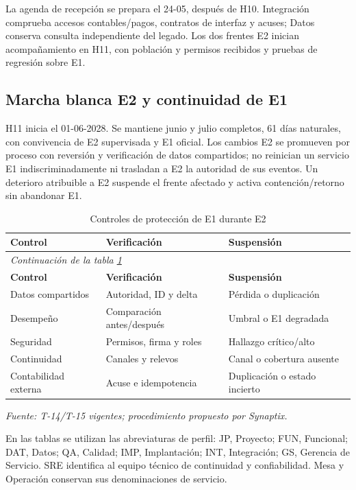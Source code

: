 La agenda de recepción se prepara el 24-05, después de H10. Integración comprueba accesos contables/pagos, contratos de interfaz y acuses; Datos conserva consulta independiente del legado. Los dos frentes E2 inician acompañamiento en H11, con población y permisos recibidos y pruebas de regresión sobre E1.

\subsection{Marcha blanca E2 y continuidad de E1}
H11 inicia el 01-06-2028. Se mantiene junio y julio completos, 61 días naturales, con convivencia de E2 supervisada y E1 oficial. Los cambios E2 se promueven por proceso con reversión y verificación de datos compartidos; no reinician un servicio E1 indiscriminadamente ni trasladan a E2 la autoridad de sus eventos. Un deterioro atribuible a E2 suspende el frente afectado y activa contención/retorno sin abandonar E1.

\begingroup\small\setlength{\tabcolsep}{3pt}
\begin{longtable}{p{}p{}p{}}
\caption{Controles de protección de E1 durante E2}\label{tab:t18-proteccion-e1}\\\hline
\textbf{Control} & \textbf{Verificación} & \textbf{Suspensión}\\\hline\endfirsthead
\multicolumn{3}{l}{\textit{Continuación de la tabla \ref{tab:t18-proteccion-e1}}}\\\hline
\textbf{Control} & \textbf{Verificación} & \textbf{Suspensión}\\\hline\endhead
\hline\endfoot\hline\endlastfoot
Datos compartidos & Autoridad, ID y delta & Pérdida o duplicación\\\hline
Desempeño & Comparación antes/después & Umbral o E1 degradada\\\hline
Seguridad & Permisos, firma y roles & Hallazgo crítico/alto\\\hline
Continuidad & Canales y relevos & Canal o cobertura ausente\\\hline
Contabilidad externa & Acuse e idempotencia & Duplicación o estado incierto\\\hline
\end{longtable}\endgroup
\noindent\textit{Fuente: T-14/T-15 vigentes; procedimiento propuesto por Synaptix.}

En las tablas se utilizan las abreviaturas de perfil: JP, Proyecto; FUN, Funcional; DAT, Datos; QA, Calidad; IMP, Implantación; INT, Integración; GS, Gerencia de Servicio. SRE identifica al equipo técnico de continuidad y confiabilidad. Mesa y Operación conservan sus denominaciones de servicio.

